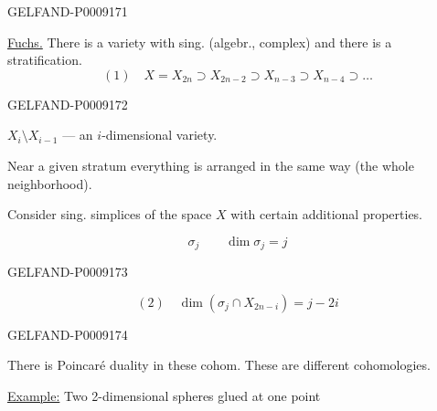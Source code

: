\begin{GelfandAdjacentEvidence}{GELFAND-P000917}{1}

\qquad {}

\uline{Fuchs.} There is a variety with sing. (algebr., complex) and there is a stratification.
\begin{equation*}
 (1)\quad X=X_{2n}\supset X_{2n-2}\supset X_{n-3}\supset X_{n-4}\supset\ldots
\end{equation*}
\end{GelfandAdjacentEvidence}
\begin{GelfandAdjacentEvidence}{GELFAND-P000917}{2}


$X_i\setminus X_{i-1}$ --- an $i$-dimensional variety.

Near a given stratum everything is arranged in the same way (the whole neighborhood).

Consider sing. simplices of the space $X$ with certain additional properties.

\begin{equation*}
 \sigma_j\qquad \dim\sigma_j=j
\end{equation*}
\end{GelfandAdjacentEvidence}
\begin{GelfandAdjacentEvidence}{GELFAND-P000917}{3}


\begin{equation*}
 (2)\quad \dim(\sigma_j\cap X_{2n-i})=j-2i
\end{equation*}
\end{GelfandAdjacentEvidence}
\begin{GelfandAdjacentEvidence}{GELFAND-P000917}{4}


There is Poincaré duality in these cohom. These are different cohomologies.

\uline{Example:} Two 2-dimensional spheres glued at one point
\end{GelfandAdjacentEvidence}
